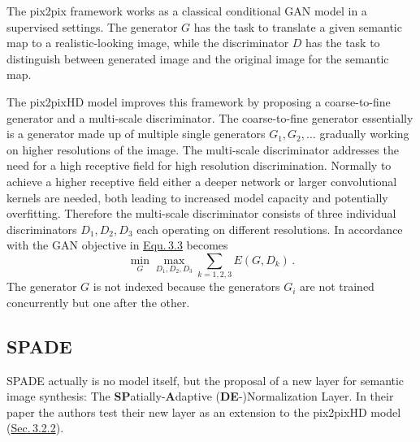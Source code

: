 The pix2pix framework works as a classical conditional GAN model in a supervised settings. The generator $G$ has the task to translate a given semantic map to a realistic-looking image, while the discriminator $D$ has the task to distinguish between generated image and the original image for the semantic map.

The pix2pixHD model improves this framework by proposing a coarse-to-fine generator and a multi-scale discriminator. The coarse-to-fine generator essentially is a generator made up of multiple single generators ${G_1, G_2, \dots}$ gradually working on higher resolutions of the image. The multi-scale discriminator addresses the need for a high receptive field for high resolution discrimination. Normally to achieve a higher receptive field either a deeper network or larger convolutional kernels are needed, both leading to increased model capacity and potentially overfitting. Therefore the multi-scale discriminator consists of three individual discriminators $D_1, D_2, D_3$ each operating on different resolutions. In accordance with the GAN objective in \hyperref[equ:3.3]{Equ.\,3.3} becomes
%
\begin{equation}
    \underset{G}{\min}\underset{D_1,D_2,D_3}{\max}\sum_{k=1,2,3}E(G,D_k)\,.
\end{equation}
%
The generator $G$ is not indexed because the generators $G_i$ are not trained concurrently but one after the other.

\subsection{SPADE} 
SPADE \cite{spade} actually is no model itself, but the proposal of a new layer for semantic image synthesis: The \textbf{SP}atially-\textbf{A}daptive (\textbf{DE}-)Normalization Layer. In their paper the authors test their new layer as an extension to the pix2pixHD model (\hyperref[sec:3.2.2]{Sec.\,3.2.2}). 


